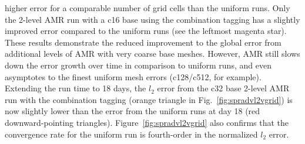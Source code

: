 higher error for a comparable number of grid cells than the uniform runs.  Only
the 2-level AMR run with a c16 base using the combination tagging has a
slightly improved error compared to the uniform runs (see the leftmost magenta star).  
These results demonstrate the reduced improvement to the global error from additional
levels of AMR with very coarse base meshes.  
However, AMR still slows down the error growth over time in comparison to uniform runs, and even asymptotes
to the finest uniform mesh errors (c128/c512, for example).  
Extending the run
time to 18 days, the $l_2$ error from the c32 base 2-level AMR run
with the combination tagging (orange triangle in
Fig.~\ref{fig:spradvl2vgrid}) is now slightly lower than the error from the
uniform runs at day 18 (red downward-pointing triangles).
Figure~\ref{fig:spradvl2vgrid} also confirms that the convergence rate for the
uniform run is fourth-order in the normalized $l_2$ error.

